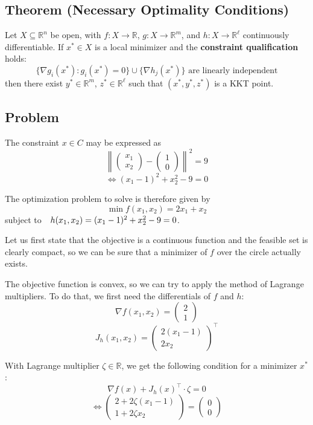\documentclass{article}
\begin{document}
\subsection{Theorem (Necessary Optimality Conditions)}
Let $X \subseteq \mathbb{R}^n$ be open, with $f:X\rightarrow\mathbb{R}$, $g:X\rightarrow\mathbb{R}^m$, and $h:X\rightarrow\mathbb{R}^\ell$ continuously differentiable. If $x^* \in X$ is a local minimizer and the \textbf{constraint qualification} holds:
\[
\{ \nabla g_i(x^*) : g_i(x^*) = 0 \} \cup \{ \nabla h_j(x^*) \} \text{ are linearly independent}
\]
then there exist $y^* \in \mathbb{R}^m$, $z^* \in \mathbb{R}^\ell$ such that $(x^*, y^*, z^*)$ is a KKT point.
\vspace{5mm}
\subsection*{Problem}
The constraint $x\in C$ may be expressed as
\[
\left\|\begin{pmatrix}x_{1}\\ x_{2}\end{pmatrix}-\begin{pmatrix}1\\ 0\end{pmatrix}\right\|^{2}=9
\]
\[
\Leftrightarrow (x_{1}-1)^{2}+x_{2}^{2}-9=0
\]

The optimization problem to solve is therefore given by
\[
\min f(x_{1},x_{2})=2x_{1}+x_{2}
\]
subject to $\hspace{7.227pt}h(x_{1},x_{2})=(x_{1}-1)^{2}+x_{2}^{2}-9=0$.

Let us first state that the objective is a continuous function and the feasible set is clearly compact, so we can be sure that a minimizer of $f$ over the circle actually exists.

The objective function is convex, so we can try to apply the method of Lagrange multipliers. To do that, we first need the differentials of $f$ and $h$:
\[
\nabla f(x_{1},x_{2})=\begin{pmatrix}2\\ 1\end{pmatrix}
\]
\[
J_{h}(x_{1},x_{2})=\begin{pmatrix}2(x_{1}-1)\\ 2x_{2}\end{pmatrix}^{\top}
\]

With Lagrange multiplier $\zeta\in\mathbb{R}$, we get the following condition for a minimizer $x^{*}$:
\[
\nabla f(x)+J_{h}(x)^{\top}\cdot\zeta=0
\]
\[
\Leftrightarrow \begin{pmatrix}2+2\zeta(x_{1}-1)\\ 1+2\zeta x_{2}\end{pmatrix}=\begin{pmatrix}0\\ 0\end{pmatrix}
\]
\end{document}
